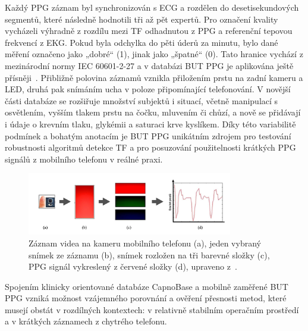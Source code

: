 Každý \acs{PPG} záznam byl synchronizován s ECG a rozdělen do desetisekundových segmentů, které následně hodnotili tři až pět expertů.
Pro označení kvality vycházeli výhradně z rozdílu mezi \acs{TF} odhadnutou z \acs{PPG} a referenční tepovou frekvencí z EKG.
Pokud byla odchylka do pěti úderů za minutu, bylo dané měření označeno jako „dobré“ (1), jinak jako „špatné“ (0).
Tato hranice vychází z mezinárodní normy IEC 60601-2-27 a v databázi \acs{BUT PPG} je aplikována ještě přísněji~\cite{BUT_PPG}.
Přibližně polovina záznamů vznikla přiložením prstu na zadní kameru a LED, druhá pak snímáním ucha v poloze připomínající telefonování.
V novější části databáze se rozšiřuje množství subjektů i situací, včetně manipulací s osvětlením, vyšším tlakem prstu na čočku, mluvením či chůzí, a nově se přidávají i údaje o krevním tlaku, glykémii a saturaci krve kyslíkem.
Díky této variabilitě podmínek a bohatým anotacím je \acs{BUT PPG} unikátním zdrojem pro testování robustnosti algoritmů detekce \acs{TF} a pro posuzování použitelnosti krátkých PPG signálů z mobilního telefonu v reálné praxi.

\begin{figure}[ht]
	\centering
	\includegraphics[width=0.8\textwidth]{./obrazky/videoZaznamPPG.png}
	\caption[Získání PPG signálu pro databázi \acs{BUT PPG}]{Záznam videa na kameru mobilního telefonu (a), jeden vybraný snímek ze záznamu (b), snímek rozložen na tři barevné složky (c), PPG signál vykreslený z červené složky (d), upraveno z~\cite{Siddiqui2016}.}
	\label{fig:videoZaznamPPG}
\end{figure}

Spojením klinicky orientované databáze CapnoBase a mobilně zaměřené \acs{BUT PPG} vzniká možnost vzájemného porovnání a ověření přesnosti metod, které musejí obstát v rozdílných kontextech: v relativně stabilním operačním prostředí a v krátkých záznamech z chytrého telefonu.